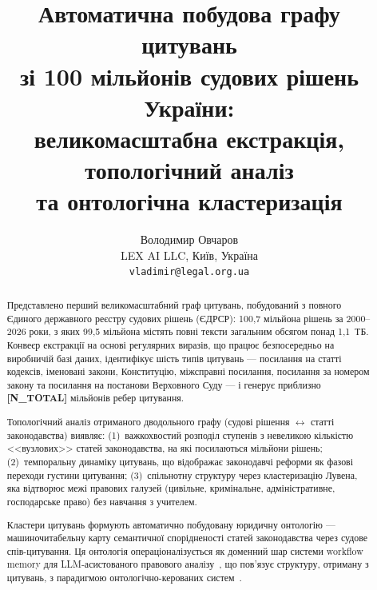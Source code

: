 \documentclass[11pt]{article}
\begin{document}

\title{Автоматична побудова графу цитувань\\зі 100 мільйонів судових рішень України:\\великомасштабна екстракція, топологічний аналіз\\та онтологічна кластеризація}

\author{
  Володимир Овчаров \\[6pt]
  LEX AI LLC, Київ, Україна \\[4pt]
  \texttt{vladimir@legal.org.ua}
}

\date{}

\maketitle

\begin{abstract}

Представлено перший великомасштабний граф цитувань, побудований з повного Єдиного державного реєстру судових рішень (ЄДРСР): 100,7 мільйона рішень за 2000--2026 роки, з яких 99,5 мільйона містять повні тексти загальним обсягом понад 1,1~ТБ.
Конвеєр екстракції на основі регулярних виразів, що працює безпосередньо на виробничій базі даних, ідентифікує шість типів цитувань --- посилання на статті кодексів, іменовані закони, Конституцію, міжсправні посилання, посилання за номером закону та посилання на постанови Верховного Суду --- і генерує приблизно \textbf{[N\_TOTAL]} мільйонів ребер цитування.

Топологічний аналіз отриманого дводольного графу (судові рішення $\leftrightarrow$ статті законодавства) виявляє: (1)~важкохвостий розподіл ступенів з невеликою кількістю <<вузлових>> статей законодавства, на які посилаються мільйони рішень; (2)~темпоральну динаміку цитувань, що відображає законодавчі реформи як фазові переходи густини цитування; (3)~спільнотну структуру через кластеризацію Лувена, яка відтворює межі правових галузей (цивільне, кримінальне, адміністративне, господарське право) без навчання з учителем.

Кластери цитувань формують автоматично побудовану юридичну онтологію --- машиночитабельну карту семантичної спорідненості статей законодавства через судове спів-цитування.
Ця онтологія операціоналізується як доменний шар системи workflow memory для LLM-асистованого правового аналізу~\citep{ovcharov2026workflowmemory}, що пов'язує структуру, отриману з цитувань, з парадигмою онтологічно-керованих систем~\citep{palagin2006architecture,palagin2023ontochatgpt}.

\end{abstract}
\end{document}
